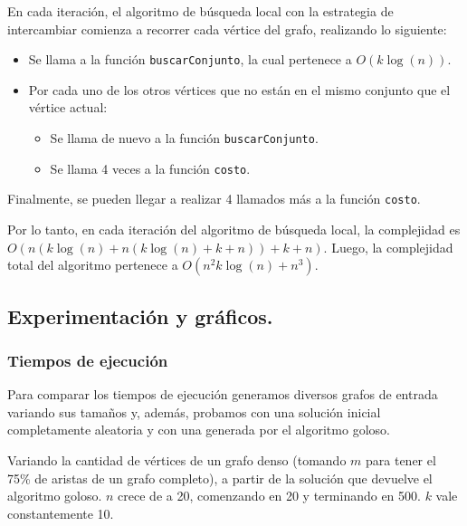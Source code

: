 En cada iteración, el algoritmo de búsqueda local con la estrategia de
intercambiar comienza a recorrer cada vértice del grafo, realizando lo siguiente:

\begin{itemize}
  \item Se llama a la función \texttt{buscarConjunto}, la cual pertenece a
  $O(k\log(n))$.

  \item Por cada uno de los otros vértices que no están en el mismo conjunto
  que el vértice actual:

  \begin{itemize}
    \item Se llama de nuevo a la función \texttt{buscarConjunto}.

    \item Se llama 4 veces a la función \texttt{costo}.
  \end{itemize}
\end{itemize}

Finalmente, se pueden llegar a realizar 4 llamados más a la función
\texttt{costo}.

Por lo tanto, en cada iteración del algoritmo de búsqueda local, la complejidad
es $O(n (k\log(n) + n (k\log(n) + k + n)) + k + n)$. Luego, la
complejidad total del algoritmo pertenece a $O(n^2k\log(n) + n^3)$.


\newpage \subsection{Experimentación y gráficos.}

\subsubsection{Tiempos de ejecución}

Para comparar los tiempos de ejecución generamos diversos grafos de entrada
variando sus tamaños y, además, probamos con una solución inicial completamente
aleatoria y con una generada por el algoritmo goloso.
\vspace*{0.5cm}

Variando la cantidad de vértices de un grafo denso (tomando $m$ para tener el
75\% de aristas de un grafo completo), a partir de la solución que devuelve el
algoritmo goloso. $n$ crece de a 20, comenzando en 20 y terminando en 500.  $k$
vale constantemente 10.

